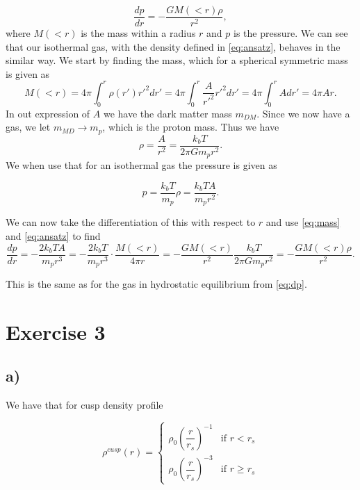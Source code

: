 \documentclass[a4paper,norsk, 10pt]{article}
\begin{document}
\begin{equation}\label{eq:dp}
\dfrac{dp}{dr} = - \dfrac{GM(<r)\rho}{r^2},
\end{equation}
where $M(<r)$ is the mass within a radius $r$ and $p$ is the pressure. We can see that our isothermal gas, with the density defined in \eqref{eq:ansatz}, behaves in the similar way. We start by finding the mass, which for a spherical symmetric mass is given as
\begin{equation}\label{eq:mass}
M(<r) = 4\pi \int_0^r \rho(r') r'^2 dr' = 4\pi \int_0^r \dfrac{A}{r'^2} r'^2 dr' = 4\pi \int_0^r A  dr' = 4\pi A r.
\end{equation}
In out expression of $A$ we have the dark matter mass $m_{DM}$. Since we now have a gas, we let $m_{MD} \rightarrow m_p$, which is the proton mass. Thus we have
\begin{equation}
\rho = \dfrac{A}{r^2} = \dfrac{k_b T}{2\pi G m_p r^2}.
\end{equation}
We when use that for an isothermal gas the pressure is given as

\begin{equation}
p = \dfrac{k_b T}{m_p}\rho = \dfrac{k_b T A}{m_p r^2}.
\end{equation}

We can now take the differentiation of this with respect to $r$ and use \eqref{eq:mass} and \eqref{eq:ansatz} to find
\begin{equation}
\frac{dp}{dr} = -\dfrac{2 k_b T A}{m_p r^3} =  -\dfrac{2 k_b T}{m_p r^3} \cdot \dfrac{M(<r)}{4\pi r} = - \frac{GM(<r)}{r^2}\dfrac{k_b T}{2\pi G m_p r^2} =  - \dfrac{GM(<r)\rho}{r^2}.
\end{equation}

This is the same as for the gas in hydrostatic equilibrium from \eqref{eq:dp}.

\section{Exercise 3}
\subsection{a)}
We have that for cusp density profile

\begin{equation}
\rho^{cusp}(r) =
\left\{
	\begin{array}{ll}
		\rho_0\left(\dfrac{r}{r_s}\right)^{-1}  & \mbox{if } r < r_s \\
		\rho_0\left(\dfrac{r}{r_s}\right)^{-3} & \mbox{if } r \geq r_s
	\end{array}
\right.
\end{equation}
\end{document}
